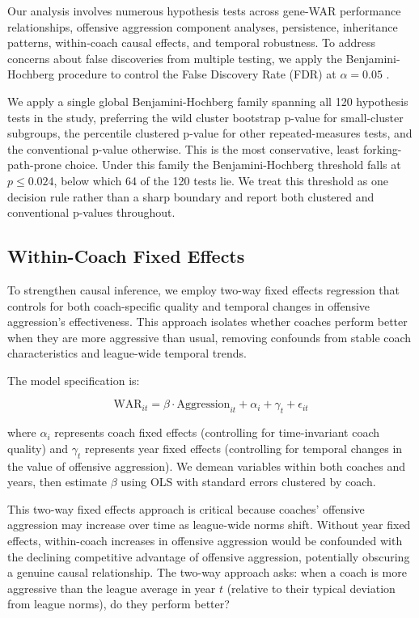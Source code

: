 \documentclass[USenglish]{article}
\theoremstyle{dgthm}
\theoremstyle{dgdef}
\begin{document}
Our analysis involves numerous hypothesis tests across gene-WAR performance relationships, offensive aggression component analyses, persistence, inheritance patterns, within-coach causal effects, and temporal robustness. To address concerns about false discoveries from multiple testing, we apply the Benjamini-Hochberg procedure to control the False Discovery Rate (FDR) at $\alpha=0.05$ \citep{benjamini1995}.

We apply a single global Benjamini-Hochberg family spanning all 120 hypothesis tests in the study, preferring the wild cluster bootstrap p-value for small-cluster subgroups, the percentile clustered p-value for other repeated-measures tests, and the conventional p-value otherwise. This is the most conservative, least forking-path-prone choice. Under this family the Benjamini-Hochberg threshold falls at $p \leq 0.024$, below which 64 of the 120 tests lie. We treat this threshold as one decision rule rather than a sharp boundary and report both clustered and conventional p-values throughout.

\subsection{Within-Coach Fixed Effects}

To strengthen causal inference, we employ two-way fixed effects regression that controls for both coach-specific quality and temporal changes in offensive aggression's effectiveness. This approach isolates whether coaches perform better when they are more aggressive than usual, removing confounds from stable coach characteristics and league-wide temporal trends.

The model specification is:

\begin{equation}
\text{WAR}_{it} = \beta \cdot \text{Aggression}_{it} + \alpha_i + \gamma_t + \epsilon_{it}
\end{equation}

where $\alpha_i$ represents coach fixed effects (controlling for time-invariant coach quality) and $\gamma_t$ represents year fixed effects (controlling for temporal changes in the value of offensive aggression). We demean variables within both coaches and years, then estimate $\beta$ using OLS with standard errors clustered by coach.

This two-way fixed effects approach is critical because coaches' offensive aggression may increase over time as league-wide norms shift. Without year fixed effects, within-coach increases in offensive aggression would be confounded with the declining competitive advantage of offensive aggression, potentially obscuring a genuine causal relationship. The two-way approach asks: when a coach is more aggressive than the league average in year $t$ (relative to their typical deviation from league norms), do they perform better?
\end{document}
